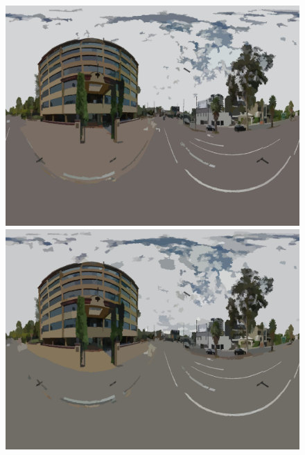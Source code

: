 \documentclass{article}
\begin{document}
\begin{figure}
\end{figure} 

\clearpage

\begin{figure}
\centering    
\textbf{}\includegraphics[scale=0.08]{Images/mean/4880_3_6_100.png} 
\textbf{}\includegraphics[scale=0.08]{Images/mean/4880_7_6_100.png} 

\end{figure}
\end{document}
